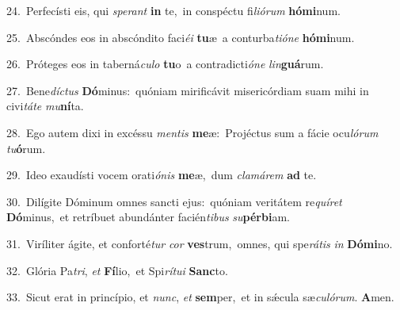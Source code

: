 {\numbfont\textcolor{\numbcolor}{24.}}~Perfecísti eis, qui \textit{spe}\-\textit{rant} \textbf{in} te,~\star in conspéctu fi\-\textit{li}\-\textit{ó}\textit{rum} \textbf{hó}\-\textbf{mi}num.\par
{\numbfont\textcolor{\numbcolor}{25.}}~Abscóndes eos in abscóndito faci\-\textit{é}\-\textit{i} \textbf{tu}\-æ~\star a conturba\-\textit{ti}\-\textit{ó}\textit{ne} \textbf{hó}\-\textbf{mi}num.\par
{\numbfont\textcolor{\numbcolor}{26.}}~Próteges eos in taberná\-\textit{cu}\-\textit{lo} \textbf{tu}\-o~\star a contradicti\-\textit{ó}\-\textit{ne} \textit{lin}\-\textbf{guá}rum.\par
{\numbfont\textcolor{\numbcolor}{27.}}~Bene\-\textit{díc}\-\textit{tus} \textbf{Dó}\-minus:~\star quóniam mirificávit misericórdiam suam mihi in civi\-\textit{tá}\-\textit{te} \textit{mu}\-\textbf{ní}ta.\par
{\numbfont\textcolor{\numbcolor}{28.}}~Ego autem dixi in excéssu \textit{men}\-\textit{tis} \textbf{me}\-æ:~\star Projéctus sum a fácie ocu\-\textit{ló}\-\textit{rum} \textit{tu}\-\textbf{ó}rum.\par
{\numbfont\textcolor{\numbcolor}{29.}}~Ideo exaudísti vocem orati\-\textit{ó}\-\textit{nis} \textbf{me}\-æ,~\star dum \textit{cla}\-\textit{má}\textit{rem} \textbf{ad} te.\par
{\numbfont\textcolor{\numbcolor}{30.}}~Dilígite Dóminum omnes sancti ejus:~\dagger quóniam veritátem re\-\textit{quí}\-\textit{ret} \textbf{Dó}\-minus,~\star et retríbuet abundánter facién\-\textit{ti}\-\textit{bus} \textit{su}\-\textbf{pér}\textbf{bi}am.\par
{\numbfont\textcolor{\numbcolor}{31.}}~Viríliter ágite, et conforté\textit{tur} \textit{cor} \textbf{ves}\-trum,~\star omnes, qui spe\-\textit{rá}\-\textit{tis} \textit{in} \textbf{Dó}\-\textbf{mi}no.\par
{\numbfont\textcolor{\numbcolor}{32.}}~Glória Pa\-\textit{tri}\-, \textit{et} \textbf{Fí}\-lio,~\star et Spi\-\textit{rí}\-\textit{tu}\textit{i} \textbf{Sanc}\-to.\par
{\numbfont\textcolor{\numbcolor}{33.}}~Sicut erat in princípio, et \textit{nunc}\-, \textit{et} \textbf{sem}\-per,~\star et in sǽcula sæ\-\textit{cu}\-\textit{ló}\textit{rum}. \textbf{A}\-men.\par
